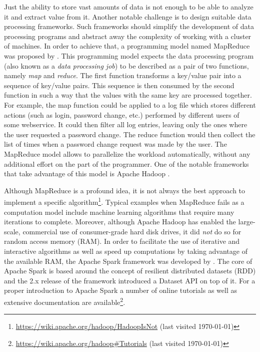 Just the ability to store vast amounts of data is not enough to be able to analyze it and extract value from it. Another notable challenge is to design suitable data processing frameworks. Such frameworks should simplify the development of data processing programs and abstract away the complexity of working with a cluster of machines. In order to achieve that, a programming model named MapReduce was proposed by \citet{2004-dean-mapreduce}. This programming model expects the data processing program (also known as a \emph{data processing job}) to be described as a pair of two functions, namely \emph{map} and \emph{reduce}. The first function transforms a key/value pair into a sequence of key/value pairs. This sequence is then consumed by the second function in such a way that the values with the same key are processed together. For example, the map function could be applied to a log file which stores different actions (such as login, password change, etc.) performed by different users of some webservice. It could then filter all log entries, leaving only the ones where the user requested a password change. The reduce function would then collect the list of times when a password change request was made by the user. The MapReduce model allows to parallelize the workload automatically, without any additional effort on the part of the programmer. One of the notable frameworks that take advantage of this model is Apache Hadoop \cite{2008-zaharia-hadoop-late}.

Although MapReduce is a profound idea, it is not always the best approach to implement a specific algorithm\footnote{\url{https://wiki.apache.org/hadoop/HadoopIsNot} (last visited \today)}. Typical examples when MapReduce fails as a computation model include machine learning algorithms that require many iterations to complete. Moreover, although Apache Hadoop has enabled the large-scale, commercial use of consumer-grade hard disk drives, it did \emph{not} do so for random access memory (RAM). In order to facilitate the use of iterative and interactive algorithms as well as speed up computations by taking advantage of the available RAM, the Apache Spark framework was developed by \citet{2016-zaharia-spark}. The core of Apache Spark is based around the concept of resilient distributed datasets (RDD) and the 2.x release of the framework introduced a Dataset API on top of it. For a proper introduction to Apache Spark a number of online tutorials as well as extensive documentation are available\footnote{\url{https://wiki.apache.org/hadoop\#Tutorials} (last visited \today)}.

